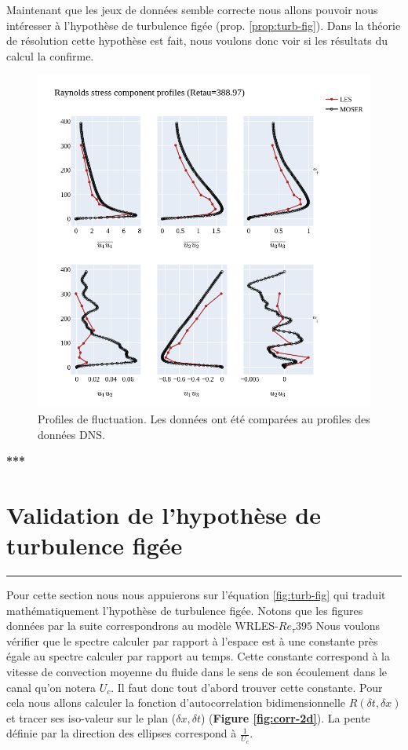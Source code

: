 \documentclass[12pt]{article}
\theoremstyle{plain}
\theoremstyle{remark}
\begin{document}
Maintenant que les jeux de données semble correcte nous allons pouvoir nous intéresser à l'hypothèse de turbulence figée (prop. \ref{prop:turb-fig}). Dans la théorie de résolution cette hypothèse est fait, nous voulons donc voir si les résultats du calcul la confirme. 

\begin{figure}[H]
	\begin{center}
		\includegraphics[width=0.8\linewidth]{../../output/figures/channel_wrles_retau395/split_time/RANS/var_velocity_profiles_all.png}
		\caption{Profiles de fluctuation. Les données ont été comparées au profiles des données DNS.}
		\label{fig:fluct-vel}
	\end{center}
\end{figure}




\begin{center}
	\large {\bf{***}}
\end{center}

\vspace{0.3cm}
\section{Validation de l'hypothèse de turbulence figée}
\noindent\rule{\linewidth}{2pt}
\vspace{0.1cm}

Pour cette section nous nous appuierons sur l'équation \ref{fig:turb-fig} qui traduit mathématiquement l'hypothèse de turbulence figée. Notons que les figures données par la suite correspondrons au modèle WRLES-$Re_{\tau}395$  Nous voulons vérifier que le spectre calculer par rapport à l'espace est à une constante près égale au spectre calculer par rapport au temps. Cette constante correspond à la vitesse de convection moyenne du fluide dans le sens de son écoulement dans le canal qu'on notera $U_c$. Il faut donc tout d'abord trouver cette constante. Pour cela nous allons calculer la fonction d'autocorrelation bidimensionnelle $R(\delta t, \delta x)$ et tracer ses iso-valeur sur le plan ($\delta x, \delta t$) ({\bf Figure \ref{fig:corr-2d}}). La pente définie par la direction des ellipses correspond à $\frac{1}{U_c}$.
\end{document}
